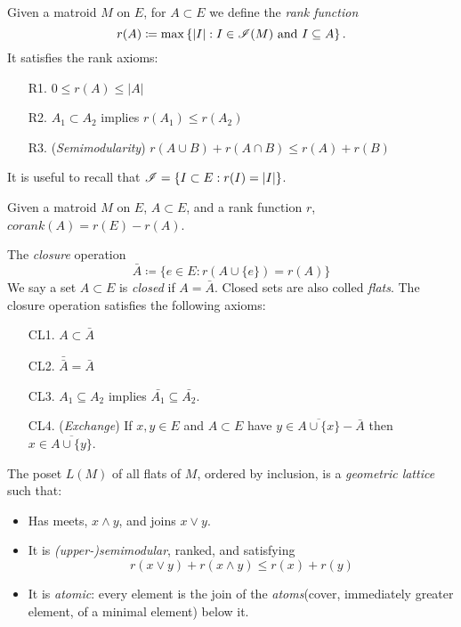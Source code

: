 \begin{definition}
    Given a matroid $M$ on $E$, for $A \subset E$ we define the \textit{rank function}
    $$ r(A) \coloneqq \max \left\lbrace |I|: I \in \mathscr{I}(M) \text{ and } I \subseteq A \right\rbrace.$$
    It satisfies the rank axioms:
    \begin{enumerate}
        \item[R1.] $0 \leq r(A) \leq |A|$
        \item[R2.] $A_1 \subset A_2$ implies $r(A_1) \leq r(A_2)$
        \item[R3.] (\textit{Semimodularity}) $r(A \cup B) + r(A \cap B) \leq r(A) + r(B)$
    \end{enumerate}
    It is useful to recall that $\mathscr{I} = \{ I \subset E : r(I) = |I| \}$.
\end{definition}

\begin{definition}[Corank]
    Given a matroid $M$ on $E$, $A \subset E$, and a rank function $r$, $corank(A) = r(E) - r(A)$.
\end{definition}

\begin{definition}
    The \textit{closure} operation
    $$\bar{A} \coloneqq \{ e \in E : r(A \cup \{ e \}) = r(A) \}$$
    We say a set $A \subset E$ is \textit{closed} if $A = \bar{A}$.
    Closed sets are also colled \textit{flats}.
    The closure operation satisfies the following axioms:
    \begin{enumerate}
        \item[CL1.] $A \subset \bar{A}$
        \item[CL2.] $\bar{\bar{A}} = \bar{A}$
        \item[CL3.] $A_1 \subseteq A_2$ implies $\bar{A_1} \subseteq \bar{A_2}$.
        \item[CL4.] (\textit{Exchange}) If $x,y \in E$ and $A \subset E$ have $y \in \overline{A \cup \{x \}} - \bar{A}$ then $x \in \overline{A \cup \{ y \}}$.
    \end{enumerate}
\end{definition}

\begin{definition}
    The poset $L(M)$ of all flats of $M$, ordered by inclusion, is a \textit{geometric lattice} such that:
    \begin{itemize}
        \item Has meets, $x \wedge y$, and joins $x \vee y$.
        \item It is \textit{(upper-)semimodular}, ranked, and satisfying
            $$ r(x \vee y) + r(x \wedge y) \leq r(x) + r(y) $$
        \item It is \textit{atomic}: every element is the join of the \textit{atoms}(cover, immediately greater element, of a minimal element) below it.
    \end{itemize}
\end{definition}

